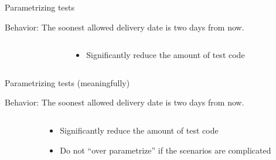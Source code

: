 \documentclass[english,handout,10pt,aspectratio=169,t]{beamer}
\begin{document}
\begin{frame}{Parametrizing tests}
  \begin{minipage}{\textwidth}
    Behavior: The soonest allowed delivery date is two days from now. 
  \end{minipage}
  \begin{columns}[T]
    \begin{column}{0.5\textwidth}
      \begin{minipage}{\textwidth}
        \parametrizeall
      \end{minipage}
    \end{column}
    \begin{column}{0.5\textwidth}
      \begin{itemize}
        \item Significantly reduce the amount of test code
      \end{itemize}
    \end{column}
  \end{columns}
\end{frame}

\begin{frame}{Parametrizing tests (meaningfully)}
  \begin{minipage}{\textwidth}
    Behavior: The soonest allowed delivery date is two days from now. 
  \end{minipage}
  \begin{columns}[T]
    \begin{column}{0.5\textwidth}
      \begin{minipage}{\textwidth}
        \parametrizesome
      \end{minipage}
    \end{column}
    \begin{column}{0.5\textwidth}
      \begin{itemize}
        \item Significantly reduce the amount of test code
        \item Do not ``over parametrize'' if the scenarios are complicated
      \end{itemize}
    \end{column}
  \end{columns}
\end{frame}
\end{document}
